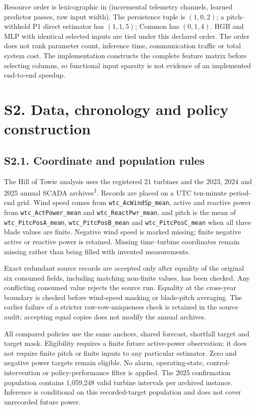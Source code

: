 \documentclass[
  british,
  11pt,
]{article}
\begin{document}
Resource order is lexicographic in (incremental telemetry channels,
learned predictor passes, raw input width). The persistence tuple is
\((1,0,2)\); a pitch-withheld P1 direct estimator has \((1,1,5)\);
Common has \((0,1,4)\). HGB and MLP with identical selected inputs are
tied under this declared order. The order does not rank parameter count,
inference time, communication traffic or total system cost. The
implementation constructs the complete feature matrix before selecting
columns, so functional input sparsity is not evidence of an implemented
end-to-end speedup.

\section{S2. Data, chronology and policy
construction}\label{s2.-data-chronology-and-policy-construction}

\subsection{S2.1. Coordinate and population
rules}\label{s2.1.-coordinate-and-population-rules}

The Hill of Towie analysis uses the registered 21 turbines and the 2023,
2024 and 2025 annual SCADA archives\textsuperscript{1}. Records are
placed on a UTC ten-minute period-end grid. Wind speed comes from
\texttt{wtc\_AcWindSp\_mean}, active and reactive power from
\texttt{wtc\_ActPower\_mean} and \texttt{wtc\_ReactPwr\_mean}, and pitch
is the mean of \texttt{wtc\_PitcPosA\_mean},
\texttt{wtc\_PitcPosB\_mean} and \texttt{wtc\_PitcPosC\_mean} when all
three blade values are finite. Negative wind speed is marked missing;
finite negative active or reactive power is retained. Missing
time--turbine coordinates remain missing rather than being filled with
invented measurements.

Exact redundant source records are accepted only after equality of the
original six consumed fields, including matching non-finite values, has
been checked. Any conflicting consumed value rejects the source run.
Equality at the cross-year boundary is checked before wind-speed masking
or blade-pitch averaging. The earlier failure of a stricter
raw-row-uniqueness check is retained in the source audit; accepting
equal copies does not modify the annual archives.

All compared policies use the same anchors, shared forecast, shortfall
target and target mask. Eligibility requires a finite future
active-power observation; it does not require finite pitch or finite
inputs to any particular estimator. Zero and negative power targets
remain eligible. No alarm, operating-state, control-intervention or
policy-performance filter is applied. The 2025 confirmation population
contains 1,059,248 valid turbine intervals per archived instance.
Inference is conditional on this recorded-target population and does not
cover unrecorded future power.
\end{document}
